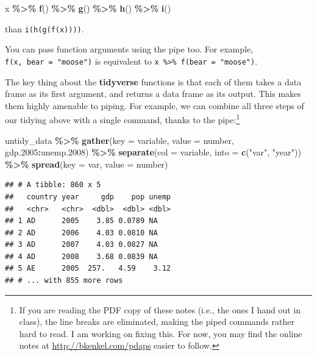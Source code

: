 \documentclass[
  12pt,
  oneside,openany]{book}
\newenvironment{Shaded}{\begin{snugshade}}{\end{snugshade}}
\newcommand{\DataTypeTok}[1]{\textcolor[rgb]{0.13,0.29,0.53}{#1}}
\newcommand{\FloatTok}[1]{\textcolor[rgb]{0.00,0.00,0.81}{#1}}
\newcommand{\KeywordTok}[1]{\textcolor[rgb]{0.13,0.29,0.53}{\textbf{#1}}}
\newcommand{\NormalTok}[1]{#1}
\newcommand{\OperatorTok}[1]{\textcolor[rgb]{0.81,0.36,0.00}{\textbf{#1}}}
\newcommand{\StringTok}[1]{\textcolor[rgb]{0.31,0.60,0.02}{#1}}
\begin{document}
\begin{Shaded}
\begin{Highlighting}[]
\NormalTok{x }\OperatorTok{\%>\%}
\StringTok{  }\KeywordTok{f}\NormalTok{() }\OperatorTok{\%>\%}
\StringTok{  }\KeywordTok{g}\NormalTok{() }\OperatorTok{\%>\%}
\StringTok{  }\KeywordTok{h}\NormalTok{() }\OperatorTok{\%>\%}
\StringTok{  }\KeywordTok{i}\NormalTok{()}
\end{Highlighting}
\end{Shaded}

than \texttt{i(h(g(f(x))))}.

You can pass function arguments using the pipe too. For example, \texttt{f(x,\ bear\ =\ "moose")} is equivalent to \texttt{x\ \%\textgreater{}\%\ f(bear\ =\ "moose")}.

The key thing about the \textbf{tidyverse} functions is that each of them takes a data frame as its first argument, and returns a data frame as its output. This makes them highly amenable to piping. For example, we can combine all three steps of our tidying above with a single command, thanks to the pipe:\footnote{If you are reading the PDF copy of these notes (i.e., the ones I hand out in class), the line breaks are eliminated, making the piped commands rather hard to read. I am working on fixing this. For now, you may find the online notes at \url{http://bkenkel.com/pdaps} easier to follow.}

\begin{Shaded}
\begin{Highlighting}[]
\NormalTok{untidy\_data }\OperatorTok{\%>\%}
\StringTok{  }\KeywordTok{gather}\NormalTok{(}\DataTypeTok{key =}\NormalTok{ variable,}
         \DataTypeTok{value =}\NormalTok{ number,}
\NormalTok{         gdp}\FloatTok{.2005}\OperatorTok{:}\NormalTok{unemp}\FloatTok{.2008}\NormalTok{) }\OperatorTok{\%>\%}
\StringTok{  }\KeywordTok{separate}\NormalTok{(}\DataTypeTok{col =}\NormalTok{ variable,}
           \DataTypeTok{into =} \KeywordTok{c}\NormalTok{(}\StringTok{"var"}\NormalTok{, }\StringTok{"year"}\NormalTok{)) }\OperatorTok{\%>\%}
\StringTok{  }\KeywordTok{spread}\NormalTok{(}\DataTypeTok{key =}\NormalTok{ var,}
         \DataTypeTok{value =}\NormalTok{ number)}
\end{Highlighting}
\end{Shaded}

\begin{verbatim}
## # A tibble: 860 x 5
##   country year     gdp    pop unemp
##   <chr>   <chr>  <dbl>  <dbl> <dbl>
## 1 AD      2005    3.85 0.0789 NA   
## 2 AD      2006    4.03 0.0810 NA   
## 3 AD      2007    4.03 0.0827 NA   
## 4 AD      2008    3.68 0.0839 NA   
## 5 AE      2005  257.   4.59    3.12
## # ... with 855 more rows
\end{verbatim}
\end{document}
